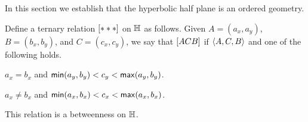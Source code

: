 In this section we establish that the hyperbolic half plane is an ordered geometry.

\begin{prop}
Define a ternary relation \([ \ast \ast \ast ]\) on \(\mathbb{H}\) as follows.
Given \(A = (a_x, a_y)\), \(B = (b_x, b_y)\), and \(C = (c_x, c_y)\), we say that \([ A C B ]\) if \(\langle A, C, B \rangle\) and one of the following holds.
\begin{proplist}
\item \(a_x = b_x\) and \(\mathsf{min}(a_y,b_y) < c_y < \mathsf{max}(a_y,b_y)\).
\item \(a_x \neq b_x\) and \(\mathsf{min}(a_x,b_x) < c_x < \mathsf{max}(a_x,b_x)\).
\end{proplist}
This relation is a betweenness on \(\mathbb{H}\).
\end{prop}

